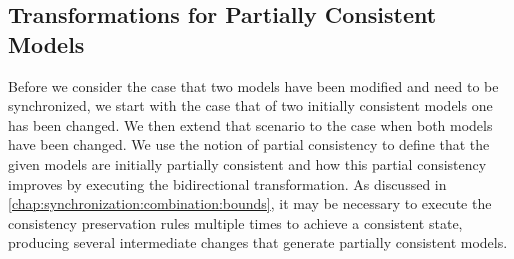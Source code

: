

\subsection{Transformations for Partially Consistent Models}
\label{chap:synchronization:bidirectional:transformations}


Before we consider the case that two models have been modified and need to be synchronized, we start with the case that of two initially consistent models one has been changed.
We then extend that scenario to the case when both models have been changed.
We use the notion of partial consistency to define that the given models are initially partially consistent and how this partial consistency improves by executing the bidirectional transformation.
As discussed in \autoref{chap:synchronization:combination:bounds}, it may be necessary to execute the consistency preservation rules multiple times to achieve a consistent state, producing several intermediate changes that generate partially consistent models.

